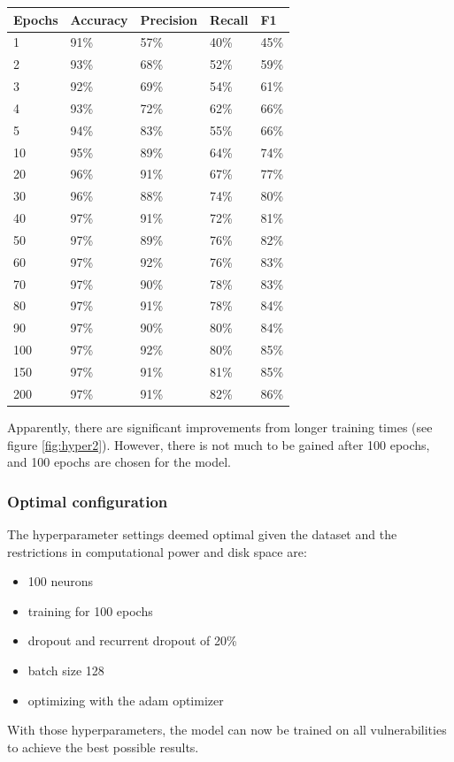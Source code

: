 \documentclass[
a4paper,
pagesize,
pdftex,
12pt,
twoside, %
BCOR=5mm, %
ngerman,
fleqn,
final,
]{scrartcl}
\begin{document}
	\begin{tabular}{ | p{2cm} || p{2cm}|p{2cm}|p{2cm}|p{2cm}|  }
		\hline
		Epochs & Accuracy & Precision & Recall & F1 \\
		\hline
		1 & 91\% &  57\% &  40\% &  45\% \\
		2 & 93\% &  68\% &  52\% &  59\% \\
		3 &  92\%&  69\%&   54\%&  61\% \\
		4 &  93\%&  72\%&   62\%&  66\% \\
		5 &  94\%&  83\%&   55\%&  66\% \\
		10 &  95\%&  89\%&   64\%&  74\% \\
		20 &  96\%&  91\%&   67\%&  77\% \\
		30 &  96\%&  88\%&   74\%&  80\% \\
		40 &  97\%&  91\%&   72\%&  81\% \\
		50 &  97\%&  89\%&   76\%&  82\% \\
		60 &  97\%&  92\%&   76\%&  83\% \\
		70 &  97\%&  90\%&   78\%&  83\% \\
		80 &  97\%&  91\%&   78\%&  84\% \\
		90 &  97\%&  90\%&   80\%&  84\% \\
		100 &  97\%&  92\%&   80\%&  85\% \\
		150 &  97\%&  91\%&   81\%&  85\% \\
		200 &  97\%&  91\%&   82\%&  86\% \\
		\hline
		\hline
	\end{tabular}
	
	Apparently, there are significant improvements from longer training times (see figure \ref{fig:hyper2}). However, there is not much to be gained after 100 epochs, and 100 epochs are chosen for the model.
	
	\subsubsection{Optimal configuration}
	
	The hyperparameter settings deemed optimal given the dataset and the restrictions in computational power and disk space are:
	\begin{itemize}
		\item 100 neurons
		\item training for 100 epochs
		\item dropout and recurrent dropout of 20\%
		\item batch size 128
		\item optimizing with the adam optimizer
	\end{itemize}
	With those hyperparameters, the model can now be trained on all vulnerabilities to achieve the best possible results.
	
\end{document}
